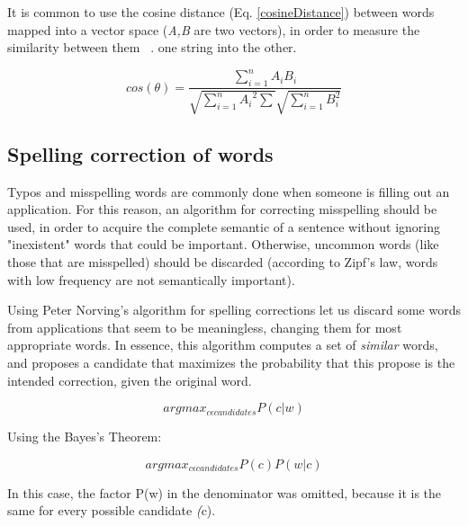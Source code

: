 It is common to use the cosine distance (Eq. \ref{cosineDistance}) between words mapped into a vector space (\textit{A,B} are two vectors), in order to measure the similarity between them ~\cite{manningh}. 
one string into the other. 
\begin{center}
\begin{equation}
\label{cosineDistance}
cos (\theta ) =  \frac{\sum_{i=1}^{n} A_iB_i}{\sqrt{\sum_{i=1}^{n}{A_i}^{2}\sum }\sqrt{\sum_{i=1}^{n}B_i^{2}}}
\end{equation}
\end{center}

%
\subsection{Spelling correction of words}
Typos and misspelling words are commonly done when someone is filling out an application.  For this reason, an algorithm for correcting misspelling should be used, in order to acquire the complete semantic of a sentence without ignoring "inexistent" words that could be important. Otherwise, uncommon words (like those that are misspelled) should be discarded (according to Zipf's law, words with low frequency are not semantically important). 

Using Peter Norving's algorithm for spelling corrections let us discard some words from applications that seem to be meaningless, changing them for most appropriate words. In essence, this algorithm computes a set of \textit{similar} words, and proposes a candidate that maximizes the probability that this propose is the intended correction, given the original word. 
\begin{center}
\begin{equation}
\label{norving_bayes}
	argmax_{c \epsilon candidates} P(c|w)
\end{equation}
\end{center}

Using the Bayes's Theorem:
 
\begin{center}
\begin{equation}
\label{norving_bayes2}
	argmax_{c \epsilon candidates} P(c)P(w|c)
\end{equation}
\end{center}

In this case, the factor P(w) in the denominator was omitted, because it is the same for every possible candidate \textit(c).

